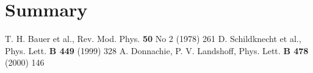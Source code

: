 \documentclass[epj,nopacs]{svjour}
\begin{document}


\section{ Summary}

\begin{thebibliography}{}
\baselineskip=0.38cm
 T. H. Bauer et al., Rev. Mod. Phys. \textbf{50} No 2 (1978) 261  
D. Schildknecht et al., Phys. Lett. \textbf{B 449} (1999) 328
A. Donnachie, P. V. Landshoff, Phys. Lett. \textbf{B 478} (2000) 146

\end{thebibliography}

\listoftodos

% 
\end{document}
